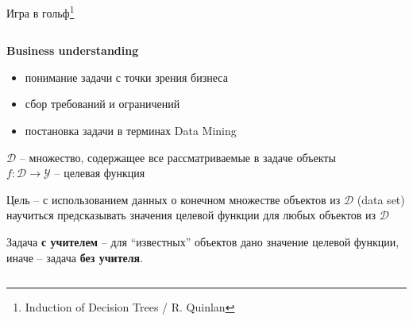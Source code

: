\documentclass[aspectratio=169]{beamer}
\begin{document}
\begin{frame}{Игра в гольф\footnote{Induction of Decision Trees / R. Quinlan}}

\begin{columns}
    \begin{column}{.7\linewidth}
    \begin{small}
    	{\bf Business understanding}
		\begin{itemize}
		\item понимание задачи с точки зрения бизнеса
		\item сбор требований и ограничений
		\item постановка задачи в терминах Data Mining
		\end{itemize}
		
		$\mathcal{D}$ -- множество, содержащее все рассматриваемые в задаче объекты \\  \vspace{1em}
		$f: \mathcal{D} \rightarrow \mathcal{Y}$ -- целевая функция \\ \vspace{1em}
		
		Цель -- с использованием данных о конечном множестве объектов из $\mathcal{D}$ (data set) научиться предсказывать значения целевой функции для любых объектов из $\mathcal{D}$
		
		\vspace{1em}
		Задача {\bf с учителем} -- для ``известных'' объектов дано значение целевой функции, иначе -- задача {\bf без учителя}.	
				\end{small}
		

\end{column}
\end{columns}
\end{frame}
\end{document}
